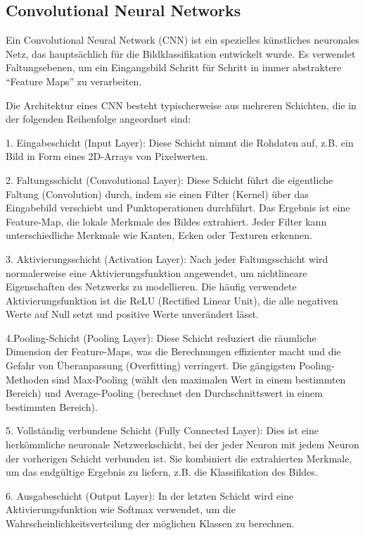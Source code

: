 \subsection{Convolutional Neural Networks}

Ein Convolutional Neural Network (CNN) ist ein spezielles künstliches neuronales Netz, das hauptsächlich für die Bildklassifikation entwickelt wurde. Es verwendet Faltungsebenen, um ein Eingangsbild Schritt für Schritt in immer abstraktere “Feature Maps” zu verarbeiten.

Die Architektur eines CNN besteht typischerweise aus mehreren Schichten, die in der folgenden Reihenfolge angeordnet sind:

1. Eingabeschicht (Input Layer): Diese Schicht nimmt die Rohdaten auf, z.B. ein Bild in Form eines 2D-Arrays von Pixelwerten.

2. Faltungsschicht (Convolutional Layer): Diese Schicht führt die eigentliche Faltung (Convolution) durch, indem sie einen Filter (Kernel) über das Eingabebild verschiebt und Punktoperationen durchführt. Das Ergebnis ist eine Feature-Map, die lokale Merkmale des Bildes extrahiert. Jeder Filter kann unterschiedliche Merkmale wie Kanten, Ecken oder Texturen erkennen.

3. Aktivierungsschicht (Activation Layer): Nach jeder Faltungsschicht wird normalerweise eine Aktivierungsfunktion angewendet, um nichtlineare Eigenschaften des Netzwerks zu modellieren. Die häufig verwendete Aktivierungsfunktion ist die ReLU (Rectified Linear Unit), die alle negativen Werte auf Null setzt und positive Werte unverändert lässt.

4.Pooling-Schicht (Pooling Layer): Diese Schicht reduziert die räumliche Dimension der Feature-Maps, was die Berechnungen effizienter macht und die Gefahr von Überanpassung (Overfitting) verringert. Die gängigsten Pooling-Methoden sind Max-Pooling (wählt den maximalen Wert in einem bestimmten Bereich) und Average-Pooling (berechnet den Durchschnittswert in einem bestimmten Bereich).

5. Vollständig verbundene Schicht (Fully Connected Layer): Dies ist eine herkömmliche neuronale Netzwerkschicht, bei der jeder Neuron mit jedem Neuron der vorherigen Schicht verbunden ist. Sie kombiniert die extrahierten Merkmale, um das endgültige Ergebnis zu liefern, z.B. die Klassifikation des Bildes.

6. Ausgabeschicht (Output Layer): In der letzten Schicht wird eine Aktivierungsfunktion wie Softmax verwendet, um die Wahrscheinlichkeitsverteilung der möglichen Klassen zu berechnen.

